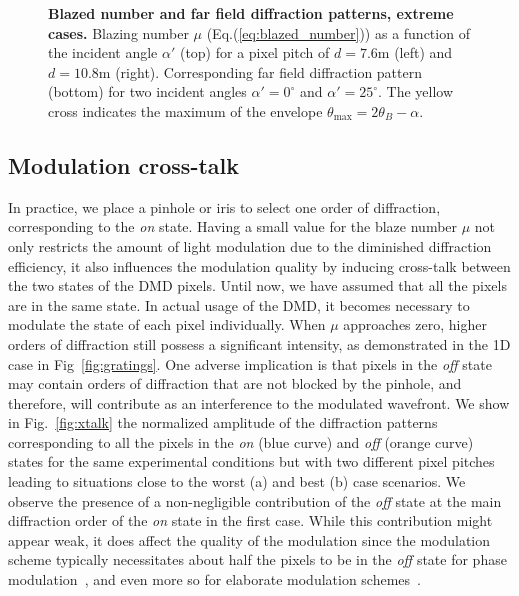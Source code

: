 \documentclass[12pt]{iopart}
\begin{document}
\begin{figure}
\begin{subfigure}{0.49\textwidth}
  \end{subfigure}
  \caption{
    \textbf{Blazed number and far field diffraction patterns, extreme cases.}
    Blazing number $\mu$ (Eq.(\ref{eq:blazed_number})) as a function of the incident angle $\alpha'$  (top)
    for a pixel pitch of $d=7.6$\textmu m (left)
    and $d=10.8$\textmu m (right).
    Corresponding far field diffraction pattern (bottom)
    for two incident angles $\alpha' = 0^\circ$ and $\alpha' = 25^\circ$.
    The yellow cross indicates the maximum of the envelope $\theta_\text{max} = 2\theta_B - \alpha$.
  }
  \label{fig:mu76}
\end{figure}

\subsection{Modulation cross-talk}

In practice, we place a pinhole or iris to select
one order of diffraction,
corresponding to the {\em on} state.
Having a small value for the blaze number $\mu$
not only restricts the amount of light modulation
due to the diminished diffraction efficiency,
it also influences the modulation quality by inducing cross-talk
between the two states of the DMD pixels.
Until now, we have assumed that all the pixels are in the same state.
In actual usage of the DMD,
it becomes necessary to modulate the state of each pixel individually.
When $\mu$ approaches zero, higher orders of diffraction
still possess a significant intensity,
as demonstrated in the 1D case in Fig~\ref{fig:gratings}.
One adverse implication is that pixels in the {\em off} state
may contain orders of diffraction that are not blocked by the pinhole,
and therefore, will contribute as an interference to the modulated wavefront.
We show in Fig.~\ref{fig:xtalk} the normalized amplitude of the diffraction patterns
corresponding to all the pixels in the {\em on} (blue curve) and {\em off} (orange curve) states
for the same experimental conditions but with two different pixel pitches
leading to situations close to the worst (a) and best (b) case scenarios.
We observe the presence of a non-negligible contribution of the {\em off} state
at the main diffraction order of the {\em on} state in the first case.
While this contribution might appear weak,
it does affect the quality of the modulation
since the modulation scheme typically necessitates about half the pixels
to be in the {\em off} state for phase modulation~\cite{lee1979binary},
and even more so for elaborate modulation schemes~\cite{goorden2014superpixel,Gutierrez2024DMD}.\\
\end{document}
